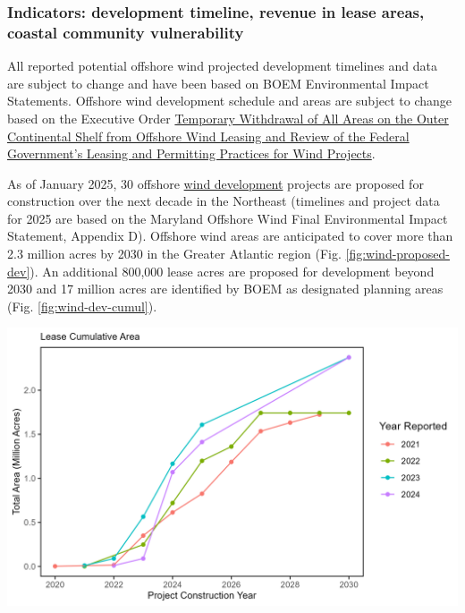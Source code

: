 \documentclass[
  10pt,
]{article}
\let\origfigure\figure
\let\endorigfigure\endfigure
\renewenvironment{figure}[1][2] {
    \expandafter\origfigure\expandafter[H]
} {
    \endorigfigure
}
\begin{document}
\subsubsection{Indicators: development timeline, revenue in lease areas, coastal community vulnerability}\label{indicators-development-timeline-revenue-in-lease-areas-coastal-community-vulnerability}

All reported potential offshore wind projected development timelines and data are subject to change and have been based on BOEM Environmental Impact Statements. Offshore wind development schedule and areas are subject to change based on the Executive Order \href{https://www.whitehouse.gov/presidential-actions/2025/01/temporary-withdrawal-of-all-areas-on-the-outer-continental-shelf-from-offshore-wind-leasing-and-review-of-the-federal-governments-leasing-and-permitting-practices-for-wind-projects/}{Temporary Withdrawal of All Areas on the Outer Continental Shelf from Offshore Wind Leasing and Review of the Federal Government's Leasing and Permitting Practices for Wind Projects}.

As of January 2025, 30 offshore \href{https://noaa-edab.github.io/catalog/wind_dev_speed.html}{wind development} projects are proposed for construction over the next decade in the Northeast (timelines and project data for 2025 are based on the Maryland Offshore Wind Final Environmental Impact Statement, Appendix D). Offshore wind areas are anticipated to cover more than 2.3 million acres by 2030 in the Greater Atlantic region (Fig. \ref{fig:wind-proposed-dev}). An additional 800,000 lease acres are proposed for development beyond 2030 and 17 million acres are identified by BOEM as designated planning areas (Fig. \ref{fig:wind-dev-cumul}).

\begin{figure}

{\centering \includegraphics[width=6.5in]{images/BothReports/wind_dev_speed_BothReports_2025-09-09} 

}

\caption{Total area proposed for wind develpment on the northeast shelf through 2030.}\label{fig:wind-proposed-dev}
\end{figure}
\end{document}
